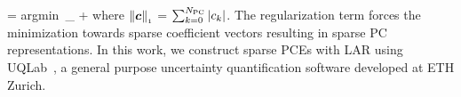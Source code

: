\be
{} = \mbox{argmin}~_{\bm\theta}
\left[\left(\sum_{k=0}^\Npc c_k \Psi_k(\bm\xi(\bm\theta)) -
\GG(\bm{\theta})\right)^{2}\right]  + \lambda{}
\label{eq:reg}
\ee
where $\left\| {\bm{c}} \right\|_{\scriptscriptstyle 1}$ = $\sum_{k=0}^{N_\text{PC}} |c_k |$.
The regularization term forces the minimization towards sparse coefficient vectors resulting
in sparse PC representations.
In this work, we construct sparse PCEs with LAR using UQLab~\cite{Marelli:2014},
a general purpose uncertainty quantification software developed at ETH Zurich.


















